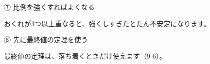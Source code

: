 \begingroup{}%
\noindent\begin{minipage}[t]{0.485\linewidth}\vspace{0pt}
\begin{tsumazuki}{⑦ 比例を強くすればよくなる}
\raggedright{}
おくれが3つ以上重なると、強くしすぎたとたん不安定になります。
\end{tsumazuki}
\end{minipage}\hfill
\begin{minipage}[t]{0.485\linewidth}\vspace{0pt}
\begin{tsumazuki}{⑧ 先に最終値の定理を使う}
\raggedright{}
最終値の定理は、落ち着くときだけ使えます（9-6）。
\end{tsumazuki}
\end{minipage}\par
\endgroup

